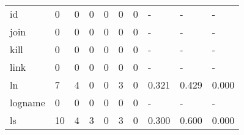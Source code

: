 \begin{longtable}{lp{1.3cm}p{1.3cm}p{1.3cm}p{1.3cm}p{1.3cm}p{1.3cm}p{1.3cm}p{1.3cm}p{1.3cm}}
id        &                      0 &                                  0 &                                 0 &                                0 &                                 0 &                               0 &                                    - &                                      - &                                    - \\
join      &                      0 &                                  0 &                                 0 &                                0 &                                 0 &                               0 &                                    - &                                      - &                                    - \\
kill      &                      0 &                                  0 &                                 0 &                                0 &                                 0 &                               0 &                                    - &                                      - &                                    - \\
link      &                      0 &                                  0 &                                 0 &                                0 &                                 0 &                               0 &                                    - &                                      - &                                    - \\
ln        &                      7 &                                  4 &                                 0 &                                0 &                                 3 &                               0 &                                0.321 &                                  0.429 &                                0.000 \\
logname   &                      0 &                                  0 &                                 0 &                                0 &                                 0 &                               0 &                                    - &                                      - &                                    - \\
ls        &                     10 &                                  4 &                                 3 &                                0 &                                 3 &                               0 &                                0.300 &                                  0.600 &                                0.000 \\

\end{longtable}

